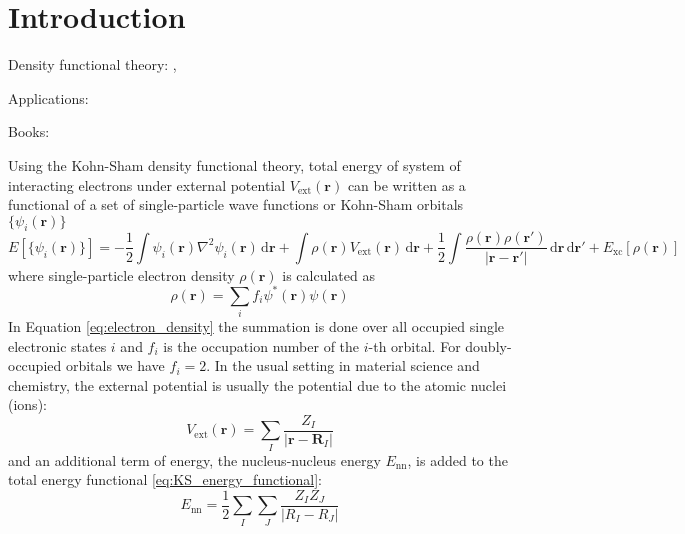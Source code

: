 \section{Introduction}

Density functional theory: \cite{Hohenberg1964,Kohn1965},

Applications: \cite{VanMourik2014}

Books: \cite{Martin2004,Kohanoff2006,Marx2009}

Using the Kohn-Sham density functional theory, total energy of system of interacting electrons
under external potential $V_{\mathrm{ext}}(\mathbf{r})$ can be written as a functional of
a set of single-particle wave functions or Kohn-Sham orbitals $\{\psi_{i}(\mathbf{r})\}$
\begin{equation}
E\left[\{\psi_{i}(\mathbf{r})\}\right] =
-\frac{1}{2} \int \psi_{i}(\mathbf{r}) \nabla^{2} \psi_{i}(\mathbf{r})\,\mathrm{d}\mathbf{r} +
\int \rho(\mathbf{r}) V_{\mathrm{ext}}(\mathbf{r})\,\mathrm{d}\mathbf{r} +
\frac{1}{2}\int
\frac{\rho(\mathbf{r}) \rho(\mathbf{r}')}{\left|\mathbf{r}-\mathbf{r}'\right|}\,
\mathrm{d}\mathbf{r}\,\mathrm{d}\mathbf{r}' + E_{\mathrm{xc}}\left[\rho(\mathbf{r})\right]
\label{eq:KS_energy_functional}
\end{equation}
%
where single-particle electron density $\rho(\mathbf{r})$ is calculated as
%
\begin{equation}
\rho(\mathbf{r}) = \sum_{i} f_{i} \psi^{*}(\mathbf{r}) \psi(\mathbf{r})
\label{eq:electron_density}
\end{equation}
%
In Equation \ref{eq:electron_density} the summation is done over
all occupied single electronic states $i$ and $f_{i}$
is the occupation number of the $i$-th orbital. For doubly-occupied orbitals
we have $f_{i}=2$.
In the usual setting in material science and chemistry, the external potential
is usually the potential due to the atomic nuclei (ions):
\begin{equation}
V_{\mathrm{ext}}(\mathbf{r}) = \sum_{I} \frac{Z_{I}}{\left|\mathbf{r} - \mathbf{R}_{I}\right|}
\end{equation}
and an additional term of energy, the nucleus-nucleus energy $E_{\mathrm{nn}}$,
is added to the total energy functional \eqref{eq:KS_energy_functional}:
\begin{equation}
E_{\mathrm{nn}} = \frac{1}{2} \sum_{I}\sum_{J}\frac{Z_{I} Z_{J}}{\left| R_{I} - R_{J} \right|}
\end{equation}

